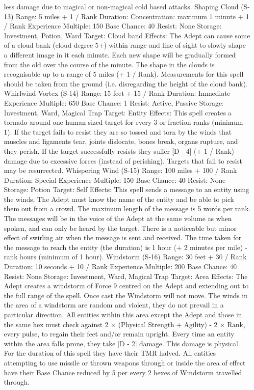 \documentclass[a4paper]{article}
\begin{document}
\begin{multicols}{3}
less damage due to magical or non-magical cold
based attacks.
Shaping Cloud (S-13)
Range: 5 miles + 1 / Rank
Duration: Concentration: maximum 1 minute + 1 /
Rank
Experience Multiple: 150
Base Chance: 40%
Resist: None
Storage: Investment, Potion, Ward
Target: Cloud band
Effects: The Adept can cause some of a cloud bank
(cloud degree 5+) within range and line of sight to
slowly shape a different image in it each minute.
Each new shape will be gradually formed from the
old over the course of the minute. The shape in the
clouds is recognisable up to a range of 5 miles (+ 1
/ Rank). Measurements for this spell should be
taken from the ground (i.e. disregarding the height
of the cloud bank).
Whirlwind Vortex (S-14)
Range: 15 feet + 15 / Rank
Duration: Immediate
Experience Multiple: 650
Base Chance: 1%
Resist: Active, Passive
Storage: Investment, Ward, Magical Trap
Target: Entity
Effects: This spell creates a tornado around one
human sized target for every 3 or fraction ranks
(minimum 1). If the target fails to resist they are so
tossed and torn by the winds that muscles and
ligaments tear, joints dislocate, bones break, organs
rupture, and they perish. If the target successfully
resists they suffer [D - 4] (+ 1 / Rank) damage due
to excessive forces (instead of perishing). Targets
that fail to resist may be resurrected.
Whispering Wind (S-15)
Range: 100 miles + 100 / Rank
Duration: Special
Experience Multiple: 150
Base Chance: 40%
Resist: None
Storage: Potion
Target: Self
Effects: This spell sends a message to an entity
using the winds. The Adept must know the name of
the entity and be able to pick them out from a
crowd. The maximum length of the message is 5
words per rank. The messages will be in the voice
of the Adept at the same volume as when spoken,
and can only be heard by the target. There is a
noticeable but minor effect of swirling air when the
message is sent and received. The time taken for
the message to reach the entity (the duration) is 1
hour (+ 2 minutes per mile) - rank hours (minimum
of 1 hour).
Windstorm (S-16)
Range: 30 feet + 30 / Rank
Duration: 10 seconds + 10 / Rank
Experience Multiple: 200
Base Chance: 40%
Resist: None
Storage: Investment, Ward, Magical Trap
Target: Area
Effects: The Adept creates a windstorm of Force 9
centred on the Adept and extending out to the full
range of the spell. Once cast the Windstorm will
not move. The winds in the area of a windstorm are
random and violent, they do not prevail in a particular direction. All entities within this area except
the Adept and those in the same hex must check
against 2 × (Physical Strength + Agility) - 2 ×
Rank, every pulse, to regain their feet and/or remain upright. Every time an entity within the area
falls prone, they take [D - 2] damage. This damage
is physical. For the duration of this spell they have
their TMR halved. All entities attempting to use
missile or thrown weapons through or inside the
area of effect have their Base Chance reduced by 5
per every 2 hexes of Windstorm travelled through.


\end{multicols}
\end{document}
